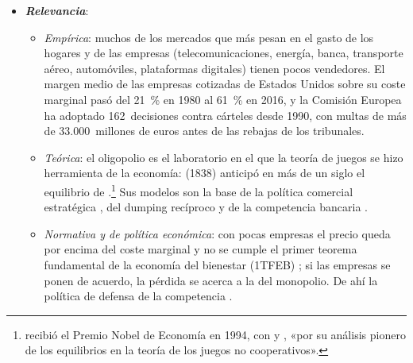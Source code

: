 \documentclass[11pt]{article}
\begin{document}
\begin{itemize}
\item \textbf{\emph{Relevancia}}:
  \begin{itemize}
  \item \emph{Empírica}: muchos de los mercados que más pesan en el gasto de los hogares y de las empresas (telecomunicaciones, energía, banca, transporte aéreo, automóviles, plataformas digitales) tienen pocos vendedores. El margen medio de las empresas cotizadas de Estados Unidos sobre su coste marginal pasó del 21~\% en 1980 al 61~\% en 2016\nocite{DeLoeckerEeckhoutUnger2020Rise}, y la Comisión Europea ha adoptado 162~decisiones contra cárteles desde 1990, con multas de más de 33.000~millones de euros antes de las rebajas de los tribunales\nocite{CE2026CartelStatistics}.
  \item \emph{Teórica}: el oligopolio es el laboratorio en el que la teoría de juegos se hizo herramienta de la economía:  (1838) anticipó en más de un siglo el equilibrio de .\footnote{ recibió el Premio Nobel de Economía en 1994, con  y , «por su análisis pionero de los equilibrios en la teoría de los juegos no cooperativos»\nocite{Nobel1994Nash}.} Sus modelos son la base de la política comercial estratégica , del dumping recíproco  y de la competencia bancaria .
  \item \emph{Normativa y de política económica}: con pocas empresas el precio queda por encima del coste marginal y no se cumple el primer teorema fundamental de la economía del bienestar (1TFEB) ; si las empresas se ponen de acuerdo, la pérdida se acerca a la del monopolio. De ahí la política de defensa de la competencia  .
  \end{itemize}


\end{itemize}
\end{document}
